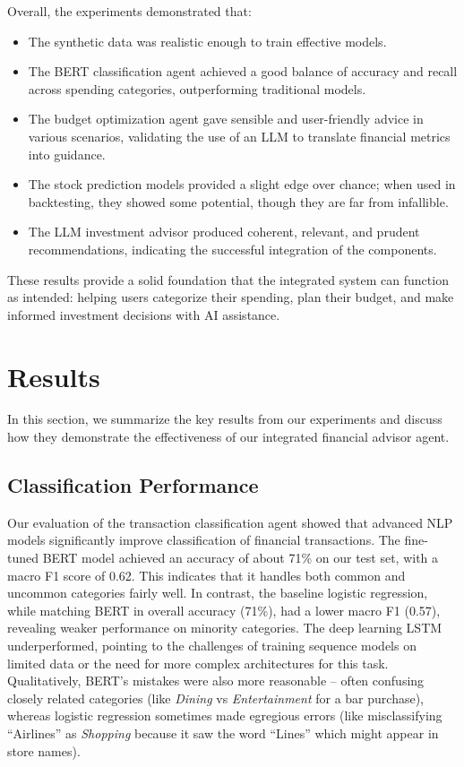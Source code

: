 \documentclass{scrartcl}
\begin{document}
Overall, the experiments demonstrated that:
\begin{itemize}
    \item The synthetic data was realistic enough to train effective models.
    \item The BERT classification agent achieved a good balance of accuracy and recall across spending categories, outperforming traditional models.
    \item The budget optimization agent gave sensible and user-friendly advice in various scenarios, validating the use of an LLM to translate financial metrics into guidance.
    \item The stock prediction models provided a slight edge over chance; when used in backtesting, they showed some potential, though they are far from infallible.
    \item The LLM investment advisor produced coherent, relevant, and prudent recommendations, indicating the successful integration of the components. 
\end{itemize}

These results provide a solid foundation that the integrated system can function as intended: helping users categorize their spending, plan their budget, and make informed investment decisions with AI assistance.

\section{Results}
In this section, we summarize the key results from our experiments and discuss how they demonstrate the effectiveness of our integrated financial advisor agent.

\subsection{Classification Performance}
Our evaluation of the transaction classification agent showed that advanced NLP models significantly improve classification of financial transactions. The fine-tuned BERT model achieved an accuracy of about 71\% on our test set, with a macro F1 score of 0.62. This indicates that it handles both common and uncommon categories fairly well. In contrast, the baseline logistic regression, while matching BERT in overall accuracy (71\%), had a lower macro F1 (0.57), revealing weaker performance on minority categories. The deep learning LSTM underperformed, pointing to the challenges of training sequence models on limited data or the need for more complex architectures for this task. Qualitatively, BERT's mistakes were also more reasonable – often confusing closely related categories (like \textit{Dining} vs \textit{Entertainment} for a bar purchase), whereas logistic regression sometimes made egregious errors (like misclassifying “Airlines” as \textit{Shopping} because it saw the word “Lines” which might appear in store names).
\end{document}
